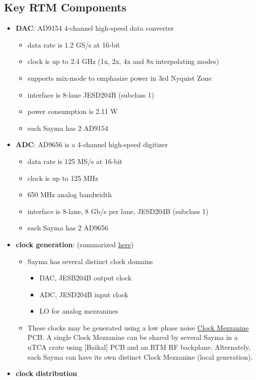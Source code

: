 \subsection{Key RTM Components}\label{key-rtm-components}

\begin{itemize}

\item
  \textbf{DAC}: AD9154 4-channel high-speed data converter

  \begin{itemize}

  \item
    data rate is 1.2 GS/s at 16-bit
  \item
    clock is up to 2.4 GHz (1x, 2x, 4x and 8x interpolating modes)
  \item
    supports mix-mode to emphasize power in 3rd Nyquist Zone
  \item
    interface is 8-lane JESD204B (subclass 1)
  \item
    power consumption is 2.11 W
  \item
    each Sayma has 2 AD9154
  \end{itemize}
\item
  \textbf{ADC}: AD9656 is a 4-channel high-speed digitizer

  \begin{itemize}

  \item
    data rate is 125 MS/s at 16-bit
  \item
    clock is up to 125 MHz
  \item
    650 MHz analog bandwidth
  \item
    interface is 8-lane, 8 Gb/s per lane, JESD204B (subclass 1)
  \item
    each Sayma has 2 AD9656
  \end{itemize}
\item
  \textbf{clock generation}: (summarized \href{SinaraClocking}{here})

  \begin{itemize}

  \item
    Sayma has several distinct clock domains

    \begin{itemize}

    \item
      DAC, JESB204B output clock
    \item
      ADC, JESD204B input clock
    \item
      LO for analog mezzanines
    \end{itemize}
  \item
    These clocks may be generated using a low phase noise
    \href{ClockMezzanines}{Clock Mezzanine} PCB. A single Clock
    Mezzanine can be shared by several Sayma in a uTCA crate using
    {[}Baikal{]} PCB and an RTM RF backplane. Alternately, each Sayma
    can have its own distinct Clock Mezzanine (local generation).
  \end{itemize}
\item
  \textbf{clock distribution}


\end{itemize}
